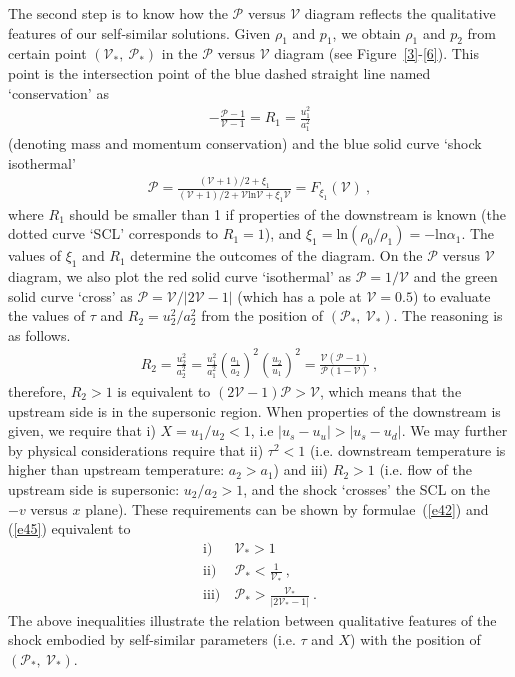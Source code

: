 \documentclass[fleqn,usenatbib]{mnras}
\begin{document}
The second step is to know how the $\mathcal{P}$ versus $\mathcal{V}$ diagram reflects the qualitative features of our self-similar solutions. Given $\rho_{1}$ and $p_{1}$, we obtain $\rho_{1}$ and $p_{2}$ from certain point $(\mathcal{V}_{*},\ \mathcal{P}_{*})$ in the $\mathcal{P}$ versus $\mathcal{V}$ diagram (see Figure~\ref{3}-\ref{6}). This point is the intersection point of the blue dashed straight line named `conservation' as 
\begin{align}
-\frac{\mathcal{P}-1}{\mathcal{V}-1}=R_{1}=\frac{u_{1}^{2}}{a_{1}^{2}}\label{e43}
\end{align}
(denoting mass and momentum conservation) and the blue solid curve `shock isothermal' 
\begin{align}
\mathcal{P}=\frac{(\mathcal{V}+1)/2+\xi_{1}}{(\mathcal{V}+1)/2+\mathcal{V}\mathrm{ln}\mathcal{V}+\xi_{1}\mathcal{V}}=F_{\xi_{1}}(\mathcal{V})\ ,\label{e44}
\end{align}
where $R_{1}$ should be smaller than 1 if properties of the downstream is known (the dotted curve `SCL' corresponds to $R_{1}=1$), and $\xi_{1}=\mathrm{ln}(\rho_{0}/\rho_{1})=-\mathrm{ln}\alpha_{1}$. The values of $\xi_{1}$ and $R_{1}$ determine the outcomes of the diagram. On the $\mathcal{P}$ versus $\mathcal{V}$ diagram, we also plot the red solid curve `isothermal' as $\mathcal{P}=1/\mathcal{V}$ and the green solid curve `cross' as $\mathcal{P}=\mathcal{V}/|2\mathcal{V}-1|$ (which has a pole at $\mathcal{V}=0.5$) to evaluate the values of $\tau$ and $R_{2}=u_{2}^{2}/a_{2}^{2}$ from the position of $(\mathcal{P}_{*},\ \mathcal{V}_{*})$. The reasoning is as follows.
\begin{align}
R_{2}=\frac{u_{2}^{2}}{a_{2}^{2}}=\frac{u_{1}^{2}}{a_{1}^{2}}\left(\frac{a_{1}}{a_{2}}\right)^{2}\left(\frac{u_{2}}{u_{1}}\right)^{2}=\frac{\mathcal{V}(\mathcal{P}-1)}{\mathcal{P}(1-\mathcal{V})}\ ,\label{e45}
\end{align}
therefore, $R_{2}>1$ is equivalent to $(2\mathcal{V}-1)\mathcal{P}>\mathcal{V}$, which means that the upstream side is in the supersonic region. When properties of the downstream is given, we require that i) $X=u_{1}/u_{2}<1$, i.e $|u_{s}-u_{u}|>|u_{s}-u_{d}|$. We may further by physical considerations require that ii) $\tau^{2}<1$ (i.e. downstream temperature is higher than upstream temperature: $a_{2}>a_{1}$) and iii) $R_{2}>1$ (i.e. flow of the upstream side is supersonic: $u_{2}/a_{2}>1$, and the shock `crosses' the SCL on the $-v$ versus $x$ plane). These requirements can be shown by formulae~(\ref{e42}) and (\ref{e45}) equivalent to
\begin{align}
\mathrm{i)}&\ \mathcal{V}_{*}>1\, \label{e46}\\
\mathrm{ii)}&\ \mathcal{P}_{*}<\frac{1}{\mathcal{V}_{*}}\ ,\label{e47}\\
\mathrm{iii)}&\ \mathcal{P}_{*}>\frac{\mathcal{V}_{*}}{|2\mathcal{V}_{*}-1|}\ .\label{e48}
\end{align}
The above inequalities illustrate the relation between qualitative features of the shock embodied by self-similar parameters (i.e. $\tau$ and $X$) with the position of $(\mathcal{P}_{*},\ \mathcal{V}_{*})$. 
\end{document}
